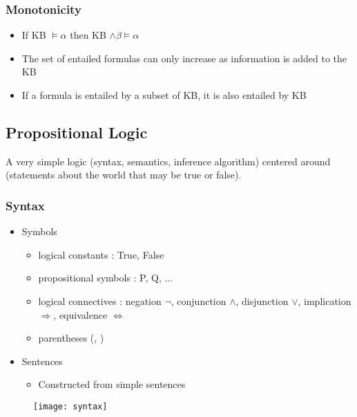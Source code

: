 \subsubsection{Monotonicity}

\begin{itemize}
\item If KB $\models \alpha$ then KB $\land \beta \models \alpha$
\item The set of entailed formulas can only increase as information is added to the KB
\item If a formula is entailed by a subset of KB, it is also entailed by KB
\end{itemize}

\newpage
\subsection{Propositional Logic}

A very simple logic (syntax, semantics, inference algorithm) centered around  (statements about the world that may be true or false).

\subsubsection{Syntax}

\begin{itemize}
\item Symbols
	\begin{itemize}
	\item logical constants : True, False
	\item propositional symbols : P, Q, ...
	\item logical connectives : negation $\neg$, conjunction $\land$, disjunction $\lor$, implication $\Rightarrow$, equivalence $\Leftrightarrow$
	\item parentheses (, )
	\end{itemize}
\item Sentences
	\begin{itemize}
	\item Constructed from simple sentences
	\end{itemize}
\end{itemize}

\begin{figure}[H]
    \centering
    \texttt{[image: syntax]}
\end{figure}

